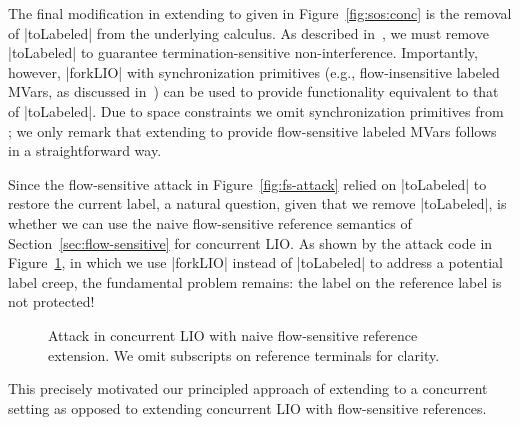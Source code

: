 The final modification in extending \lioafs{} to \lioconc{} given in
Figure~\ref{fig:sos:conc} is the removal of |toLabeled| from the underlying
calculus.
%
As described in~\cite{stefan:addressing-covert}, we must remove |toLabeled| to
guarantee termination-sensitive non-interference.
%
Importantly, however, |forkLIO| with synchronization primitives (e.g.,
flow-insensitive labeled MVars, as discussed
in~\cite{stefan:addressing-covert}) can be used to provide functionality
equivalent to that of |toLabeled|.
%
Due to space constraints we omit synchronization primitives from
\lioconc{};
we only remark that extending \lioconc{} to provide flow-sensitive
labeled MVars follows in a straightforward way.

Since the flow-sensitive attack in Figure~\ref{fig:fs-attack} relied
on |toLabeled| to restore the current label, a natural question, given
that we remove |toLabeled|, is whether we can use the naive
flow-sensitive reference semantics of Section~\ref{sec:flow-sensitive}
for concurrent LIO.
%
As shown by the attack code in Figure~\ref{fig:fs-conc-attack}, in
which we use |forkLIO| instead of |toLabeled| to address a potential
label creep, the fundamental problem remains: the label on the
reference label is not protected!
%
\begin{figure}
\small
{}
\cut{$}
\caption{Attack in concurrent LIO with naive flow-sensitive reference
extension. We omit subscripts on reference terminals for clarity.
\label{fig:fs-conc-attack}}
\end{figure}
%
This precisely motivated our principled approach of extending \lioafs{} to a
concurrent setting as opposed to extending concurrent LIO with flow-sensitive
references.

